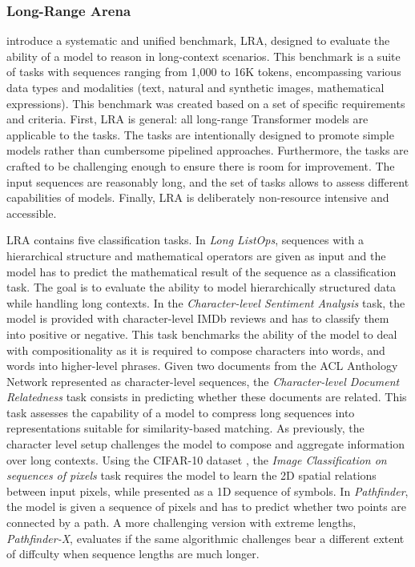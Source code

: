 \subsubsection{Long-Range Arena} \citet{tay2020long} introduce a systematic and unified benchmark, \ac{LRA}, designed to evaluate the ability of a model to reason in long-context scenarios. This benchmark is a suite of tasks with sequences ranging from 1,000 to 16K tokens, encompassing various data types and modalities (text, natural and synthetic images, mathematical expressions). This benchmark was created based on a set of specific requirements and criteria. First, \ac{LRA} is general: all long-range Transformer models are applicable to the tasks. The tasks are intentionally designed to promote simple models rather than cumbersome pipelined approaches. Furthermore, the tasks are crafted to be challenging enough to ensure there is room for improvement. The input sequences are reasonably long, and the set of tasks allows to assess different capabilities of models. Finally, \ac{LRA} is deliberately non-resource intensive and accessible. 

\ac{LRA} contains five classification tasks. In \textit{Long ListOps}, sequences with a hierarchical structure and mathematical operators are given as input and the model has to predict the mathematical result of the sequence as a classification task. The goal is to evaluate the ability to model hierarchically structured data while handling long contexts. 
In the \textit{Character-level Sentiment Analysis} task, the model is provided with character-level IMDb reviews \citep{maas2011learning} and has to classify them into positive or negative. This task benchmarks the ability of the model to deal with compositionality as it is required to compose characters into words, and words into higher-level phrases.
Given two documents from the ACL Anthology Network \citep{radev2013acl} represented as character-level sequences, the \textit{Character-level Document Relatedness} task consists in predicting whether these documents are related. This task assesses the capability of a model to compress long sequences into representations suitable for similarity-based matching. As previously, the character level setup challenges the model to compose and aggregate information over long contexts.
Using the CIFAR-10 dataset \citep{krizhevsky2009learning}, the \textit{Image Classification on sequences of pixels} task requires the model to learn the 2D spatial relations between input pixels, while presented as a 1D sequence of symbols.
In \textit{Pathfinder}, the model is given a sequence of pixels and has to predict whether two points are connected by a path. A more challenging version with extreme lengths, \textit{Pathfinder-X}, evaluates if the same algorithmic challenges bear a different extent of diffculty when sequence lengths are much longer.

